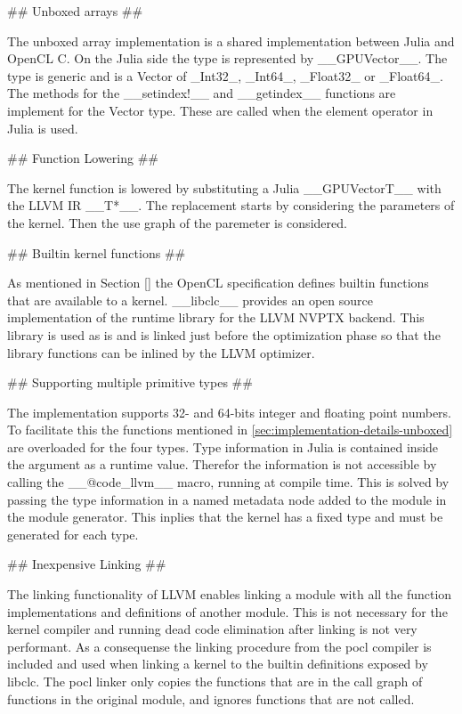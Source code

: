 \begin{markdown}
## Unboxed arrays ##
\label{sec:implementation-details-unboxed}

The unboxed array implementation is a shared implementation between
Julia and OpenCL C. On the Julia side the type is represented by
__GPUVector__. The type is generic and is a Vector of _Int32_,
_Int64_, _Float32_ or _Float64_. The methods for the __setindex!__ and
__getindex__ functions are implement for the Vector type. These are
called when the element operator in Julia is used.

## Function Lowering ##

The kernel function is lowered by substituting a Julia
__GPUVector{T}__ with the LLVM IR __T*__. The replacement starts by
considering the parameters of the kernel. Then the use graph of the
paremeter is considered. 

## Builtin kernel functions ##

As mentioned in Section \ref{} the OpenCL specification defines
builtin functions that are available to a kernel. __libclc__
\cite{libclc} provides an open source implementation of the runtime
library for the LLVM NVPTX backend. This library is used as is and is
linked just before the optimization phase so that the library functions
can be inlined by the LLVM optimizer.

## Supporting multiple primitive types ##

The implementation supports 32- and 64-bits integer and floating point
numbers. To facilitate this the functions mentioned in
\ref{sec:implementation-details-unboxed} are overloaded for the four
types. Type information in Julia is contained inside the argument as a
runtime value. Therefor the information is not accessible by calling
the __@code_llvm__ macro, running at compile time. This is solved by
passing the type information in a named metadata node added to the
module in the module generator. This inplies that the kernel has a fixed
type and must be generated for each type.

## Inexpensive Linking ##

The linking functionality of \gls{LLVM} enables linking a module with
all the function implementations and definitions of another
module. This is not necessary for the kernel compiler and running dead
code elimination after linking is not very performant. As a
consequense the linking procedure from the \gls{pocl} \cite{pocl} compiler is
included and used when linking a kernel to the builtin definitions
exposed by libclc. The \gls{pocl} linker only copies the functions
that are in the call graph of functions in the original module, and
ignores functions that are not called.

\end{markdown}
